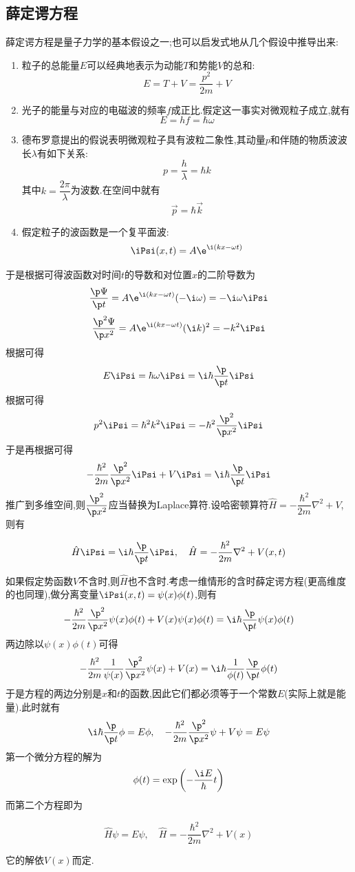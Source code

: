 \documentclass{ctexbook}
\begin{document}
\subsection{薛定谔方程}
薛定谔方程是量子力学的基本假设之一;也可以启发式地从几个假设中推导出来:
\begin{enumerate}[label=\tbf{\alph*.}]
    \item 粒子的总能量$E$可以经典地表示为动能$T$和势能$V$的总和:
    \[E=T+V=\dfrac{p^2}{2m}+V\]
    \item 光子的能量与对应的电磁波的频率$f$成正比.假定这一事实对微观粒子成立,就有
    \[E=hf=\hbar\omega\]
    \item 德布罗意提出的假说表明微观粒子具有波粒二象性,其动量$p$和伴随的物质波波长$\lambda$有如下关系:
    \[p=\dfrac{h}{\lambda}=\hbar k\]
    其中$k=\dfrac{2\pi}{\lambda}$为波数.在空间中就有
    \[\vec{p}=\hbar\vec{k}\]
    \item 假定粒子的波函数是一个复平面波:
    \[\iPsi(x,t)=A\e^{\i(kx-\omega t)}\]
\end{enumerate}
\indent 于是根据可得波函数对时间$t$的导数和对位置$x$的二阶导数为
\[\dfrac{\p\Psi}{\p t}=A\e^{\i(kx-\omega t)}(-\i\omega)=-\i\omega\iPsi\]
\[\dfrac{\p^2\Psi}{\p x^2}=A\e^{\i(kx-\omega t)}(\i k)^2=-k^2\iPsi\]
根据可得
\[E\iPsi=\hbar\omega\iPsi=\i\hbar\dfrac{\p}{\p t}\iPsi\]
根据可得
\[p^2\iPsi=\hbar^2k^2\iPsi=-\hbar^2\dfrac{\p^2}{\p x^2}\iPsi\]
于是再根据可得
\[-\dfrac{\hbar^2}{2m}\dfrac{\p^2}{\p x^2}\iPsi+V\iPsi=\i\hbar\dfrac{\p}{\p t}\iPsi\]
推广到多维空间,则$\dfrac{\p^2}{\p x^2}$应当替换为Laplace算符.设哈密顿算符$\hat{H}=-\dfrac{\hbar^2}{2m}\nabla^2+V$,则有
\begin{theorem}[含时薛定谔方程]
    \[\hat{H}\iPsi=\i\hbar\dfrac{\p}{\p t}\iPsi,\quad\hat{H}=-\dfrac{\hbar^2}{2m}\nabla^2+V(x,t)\]
\end{theorem}
如果假定势函数$V$不含时,则$\hat{H}$也不含时.考虑一维情形的含时薛定谔方程(更高维度的也同理),做分离变量$\iPsi(x,t)=\psi(x)\phi(t)$,则有
\[-\dfrac{\hbar^2}{2m}\dfrac{\p^2}{\p x^2}\psi(x)\phi(t)+V(x)\psi(x)\phi(t)=\i\hbar\dfrac{\p}{\p t}\psi(x)\phi(t)\]
两边除以$\psi(x)\phi(t)$可得
\[-\dfrac{\hbar^2}{2m}\dfrac{1}{\psi(x)}\dfrac{\p^2}{\p x^2}\psi(x)+V(x)=\i\hbar\dfrac{1}{\phi(t)}\dfrac{\p}{\p t}\phi(t)\]
于是方程的两边分别是$x$和$t$的函数,因此它们都必须等于一个常数$E$(实际上就是能量).此时就有
\[\i\hbar\dfrac{\p}{\p t}\phi=E\phi,\quad-\dfrac{\hbar^2}{2m}\dfrac{\p^2}{\p x^2}\psi+V\psi=E\psi\]
第一个微分方程的解为
\[\phi(t)=\exp\left(-\dfrac{\i E}{\hbar}t\right)\]
而第二个方程即为
\begin{theorem}[定态薛定谔方程]
    \[\hat{H}\psi=E\psi,\quad\hat{H}=-\dfrac{\hbar^2}{2m}\nabla^2+V(x)\]
\end{theorem}
它的解依$V(x)$而定.
\end{document}
